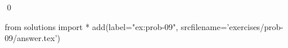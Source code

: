 
\begin{ex} 
  \label{ex:prob-09}
  
  \qed
\end{ex} 
\begin{python0}
from solutions import *
add(label="ex:prob-09",
    srcfilename='exercises/prob-09/answer.tex') 
\end{python0}
